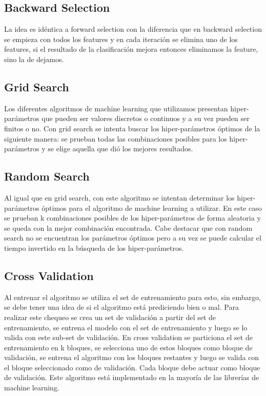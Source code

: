 \documentclass[12pt]{article}
\begin{document}
\subsection{Backward Selection}
La idea es idéntica a forward selection con la diferencia que en backward selection se empieza con todos los features y en cada iteración se elimina uno de los features, si el resultado de la clasificación mejora entonces eliminamos la feature, sino la de dejamos.

\subsection{Grid Search}
Los diferentes algoritmos de machine learning que utilizamos presentan hiper-parámetros que pueden ser valores discretos o continuos y a su vez pueden ser finitos o no.
Con grid search se intenta buscar los hiper-parámetros óptimos de la siguiente manera: se prueban todas las combinaciones posibles para los hiper-parámetros y se elige aquella que dió los mejores resultados.

\subsection{Random Search}
Al igual que en grid search, con este algoritmo se intentan determinar los hiper-parámetros óptimos para el algoritmo de machine learning a utilizar. En este caso se prueban k combinaciones posibles de los hiper-parámetros de forma aleatoria y se queda con la mejor combinación encontrada.
Cabe destacar que con random search no se encuentran los parámetros óptimos pero a su vez se puede calcular el tiempo invertido en la búsqueda de los hiper-parámetros.

\subsection{Cross Validation}
Al entrenar el algoritmo se utiliza el set de entrenamiento para esto, sin embargo, se debe tener una idea de si el algoritmo está prediciendo bien o mal. Para realizar este chequeo se crea un set de validación a partir del set de entrenamiento, se entrena el modelo con el set de entrenamiento y luego se lo valida con este sub-set de validación.
En cross validation se particiona el set de entrenamiento en k bloques, se selecciona uno de estos bloques como bloque de validación, se entrena el algoritmo con los bloques restantes y luego se valida con el bloque seleccionado como de validación. Cada bloque debe actuar como bloque de validación.
Este algoritmo está implementado en la mayoría de las librerías de machine learning.
\end{document}
